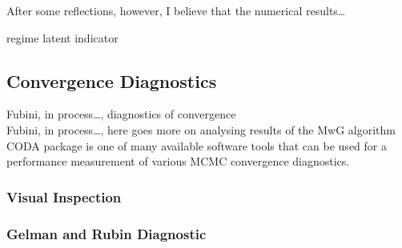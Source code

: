 \documentclass[a4paper,11pt,english]{article}
\begin{document}
			After some reflections, however, I believe that the numerical results\ldots
	
			
			regime latent indicator %
						
			
		\subsection{Convergence Diagnostics}
		
		
		Fubini, in process\ldots, diagnostics of convergence	\\
		
		Fubini, in process\ldots, here goes more on analysing results of the MwG algorithm \\
		
		CODA package is one of many available software tools that can be used for a performance measurement of various MCMC convergence diagnostics.

				
			\subsubsection{Visual Inspection}

			\subsubsection{Gelman and Rubin Diagnostic}

\end{document}
